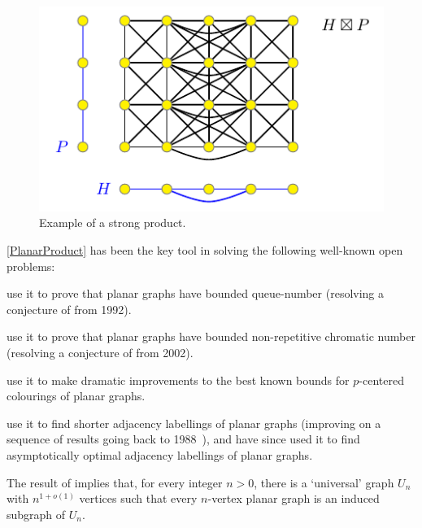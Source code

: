 \documentclass{patmorin}
\begin{document}
\begin{figure}[!h]
\centering%
	\includegraphics{ProductExample}
	\caption{Example of a strong product.
	\label{ProductExample}}
\end{figure}

\noindent\cref{PlanarProduct} has been the key tool in solving the following well-known open problems:
\begin{compactitem}
\item \citet{DJMMUW20} use it to prove that planar graphs have bounded queue-number (resolving a conjecture of \citet{HLR92} from 1992).
\item  \citet{dujmovic.esperet.ea:planar} use it to prove that planar graphs have bounded non-repetitive chromatic number (resolving a conjecture of \citet{AGHR-RSA02} from 2002).
\item \citet{DFMS21} use it to make dramatic improvements to the best known bounds for $p$-centered colourings of planar graphs. 
\item \citet{bonamy.gavoille.ea:shorter} use it to find shorter adjacency labellings of planar graphs (improving on a sequence of results going back to 1988~\citep{kannan.naor.ea:implicit-stoc,kannan.naor.ea:implicit}), and \citet{DEJGMM21} have since used it to find asymptotically optimal adjacency labellings of planar graphs.
\item The result of \citet{DEJGMM21} implies that, for every integer
$n>0$, there is a `universal' graph $U_n$ with $n^{1+o(1)}$ vertices such that every $n$-vertex planar graph is an induced
subgraph of $U_n$.
\end{compactitem} 
\end{document}

